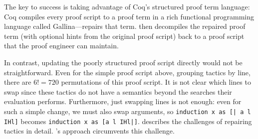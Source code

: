 The key to success is taking advantage of Coq's structured proof term language:
Coq compiles every proof script to a proof term in a rich functional programming language called 
Gallina---\toolname repairs that term.
\toolname then decompiles the repaired proof term (with optional hints from the original proof script) back 
to a proof script that the proof engineer can maintain.

In contrast, updating the poorly structured proof script directly would not be straightforward.
Even for the simple proof script above, grouping tactics by line, there are $6! = 720$ permutations of this proof script.
It is not clear which lines to swap since these tactics do not have a semantics beyond the searches their evaluation performs.
Furthermore, just swapping lines is not enough: even for such a simple change, we must also swap
arguments, so \lstinline{induction x as [| a l IHl]} becomes \lstinline{induction x as [a l IHl|]}.
\citet{robert2018} describes the challenges of repairing tactics in detail.
\toolname's approach circumvents this challenge.




